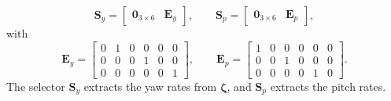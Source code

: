 \documentclass[12pt,a4paper]{report}
\begin{document}
\begin{equation}
\mathbf{S}_y =
\begin{bmatrix}
\mathbf{0}_{3\times6} & \mathbf{E}_y
\end{bmatrix},
\qquad
\mathbf{S}_p =
\begin{bmatrix}
\mathbf{0}_{3\times6} & \mathbf{E}_p
\end{bmatrix},
\end{equation}
with
\begin{equation}
\mathbf{E}_y =
\begin{bmatrix}
0 & 1 & 0 & 0 & 0 & 0 \\
0 & 0 & 0 & 1 & 0 & 0 \\
0 & 0 & 0 & 0 & 0 & 1
\end{bmatrix},
\qquad
\mathbf{E}_p =
\begin{bmatrix}
1 & 0 & 0 & 0 & 0 & 0 \\
0 & 0 & 1 & 0 & 0 & 0 \\
0 & 0 & 0 & 0 & 1 & 0
\end{bmatrix}.
\end{equation}
The selector $\mathbf{S}_y$ extracts the yaw rates from $\boldsymbol{\zeta}$, and $\mathbf{S}_p$ extracts the pitch rates.
\end{document}
